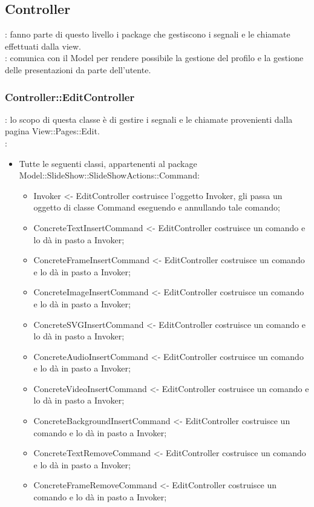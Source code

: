 \subsection{Controller}{
	\textbf{\tipo}: fanno parte di questo livello i package che gestiscono i segnali e le chiamate effettuati dalla view.\\
	\textbf{\relaz}: comunica con il Model per rendere possibile la gestione del profilo e la gestione delle presentazioni da parte dell'utente.
	
	\subsubsection{Controller::\-EditController}{
		\textbf{\tipo}: lo scopo di questa classe è di gestire i segnali e le chiamate provenienti dalla pagina View::\-Pages::\-Edit.\\	
		\textbf{\relaz}:
		\begin{itemize}
			\item Tutte le seguenti classi, appartenenti al package Model::\-SlideShow::\-SlideShowActions::\-Command:
			\begin{itemize}
				\item Invoker <- EditController costruisce l'oggetto Invoker, gli passa un oggetto di classe Command eseguendo e annullando tale comando;
				\item ConcreteTextInsertCommand <- EditController costruisce un comando e lo dà in pasto a Invoker;
				\item ConcreteFrameInsertCommand <- EditController costruisce un comando e lo dà in pasto a Invoker;
				\item ConcreteImageInsertCommand <- EditController costruisce un comando e lo dà in pasto a Invoker;
				\item ConcreteSVGInsertCommand <- EditController costruisce un comando e lo dà in pasto a Invoker;
				\item ConcreteAudioInsertCommand <- EditController costruisce un comando e lo dà in pasto a Invoker;
				\item ConcreteVideoInsertCommand <- EditController costruisce un comando e lo dà in pasto a Invoker;
				\item ConcreteBackgroundInsertCommand <- EditController costruisce un comando e lo dà in pasto a Invoker;
				\item ConcreteTextRemoveCommand <- EditController costruisce un comando e lo dà in pasto a Invoker;
				\item ConcreteFrameRemoveCommand <- EditController costruisce un comando e lo dà in pasto a Invoker;

\end{itemize}
\end{itemize}}}
